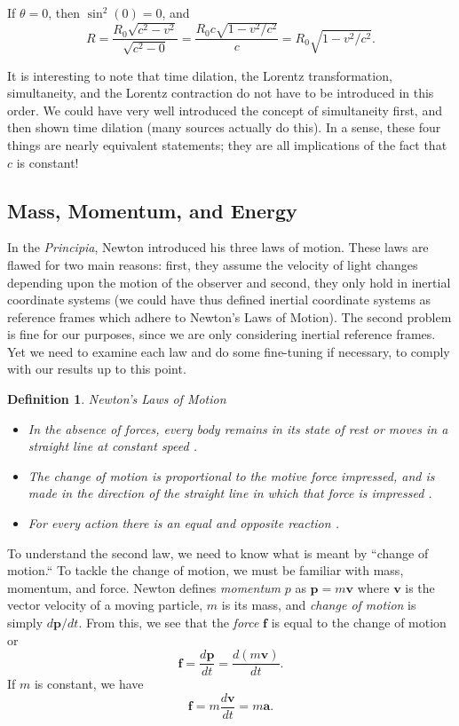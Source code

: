 \documentclass[12pt]{article}
\theoremstyle{defn}
\newtheorem{defn}{Definition}
\theoremstyle{pf}
\newcommand{\0}{\emptyset}
\renewcommand{\-}{\setminus}
\begin{document}
If $\theta=0$, then $\sin^2(0)=0$, and $$R=\dfrac{R_0\sqrt{c^2-v^2}}{\sqrt{c^2-0}}=\dfrac{R_0c\sqrt{1-v^2/c^2}}{c}=R_0\sqrt{1-v^2/c^2}.$$

It is interesting to note that time dilation, the Lorentz transformation, simultaneity, and the Lorentz contraction do not have to be introduced in this order. We could have very well introduced the concept of simultaneity first, and then shown time dilation (many sources actually do this). In a sense, these four things are nearly equivalent statements; they are all implications of the fact that $c$ is constant!


\subsection{Mass, Momentum, and Energy}

In the \textit{Principia}, Newton introduced his three laws of motion. These laws are flawed for two main reasons: first, they assume the velocity of light changes depending upon the motion of the observer and second, they only hold in inertial coordinate systems (we could have thus defined inertial coordinate systems as reference frames which adhere to Newton's Laws of Motion). The second problem is fine for our purposes, since we are only considering inertial reference frames. Yet we need to examine each law and do some fine-tuning if necessary, to comply with our results up to this point.

\begin{defn}{Newton's Laws of Motion}
\begin{itemize}
\item[1.]In the absence of forces, every body remains in its state of rest or moves in a straight line at constant speed \cite{callahan}.
\item[2.]The \textit{change of motion} is proportional to the \textit{motive force} impressed, and is made in the direction of the straight line in which that force is impressed \cite{callahan}.
\item[3.]For every \textit{action} there is an equal and opposite reaction \cite{woodhouse}.
\end{itemize}
\end{defn}

To understand the second law, we need to know what is meant by ``change of motion.`` To tackle the change of motion, we must be familiar with mass, momentum, and force. Newton defines \textit{momentum} $\textit{p}$ as $\textbf{p}=m\textbf{v}$ where $\textbf{v}$ is the vector velocity of a moving particle, $m$ is its mass, and \textit{change of motion} is simply $d\textbf{p}/dt$. From this, we see that the \textit{force} $\textbf{f}$ is equal to the change of motion or
$$\textbf{f}=\dfrac{d\textbf{p}}{dt}=\dfrac{d(m\textbf{v})}{dt}.$$ If $m$ is constant, we have $$\textbf{f}=m\dfrac{d\textbf{v}}{dt}=m\textbf{a}.$$ 
\end{document}

